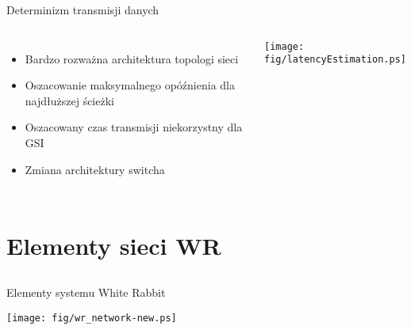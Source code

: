 \documentclass[compress,red]{beamer}
\begin{document}
\begin{frame}{Determinizm transmisji danych}


  \begin{columns}[c]

  

  \begin{itemize}
    \item Bardzo rozważna architektura topologi sieci
    \item Oszacowanie maksymalnego opóźnienia dla najdłuższej ścieżki
    \item Oszacowany czas transmisji niekorzystny dla GSI
    \item Zmiana architektury switcha
  \end{itemize}

  

      \begin{center}
      \texttt{[image: fig/latencyEstimation.ps]}
      \end{center}

      

  \end{columns}


\end{frame}


\section{Elementy sieci WR}
\subsection{}
\begin{frame}{Elementy systemu White Rabbit}

      \begin{center}
      \texttt{[image: fig/wr\_network-new.ps]}
      \end{center}

\end{frame}
\end{document}
